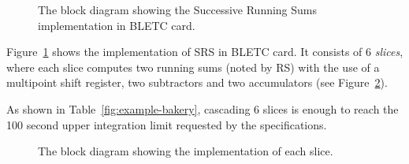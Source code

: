 \documentclass{llncs}
\begin{document}
\begin{figure}[t]
  \centering {}
   \caption{The block diagram showing the Successive Running Sums implementation in BLETC card.}
  \label{fig:srs}
\end{figure}


Figure~\ref{fig:srs} shows the implementation of SRS in BLETC card. It consists of 6 \emph{slices}, where each slice computes two running sums (noted by RS) with the use of a multipoint shift register, two subtractors and two accumulators (see Figure~\ref{fig:slice}).

As shown in Table~\ref{fig:example-bakery}, cascading 6 slices is enough to reach the 100 second upper integration limit requested by the specifications.

\begin{figure}[t]
  \centering {}
   \caption{The block diagram showing the implementation of each slice.}
  \label{fig:slice}
\end{figure}
\end{document}
